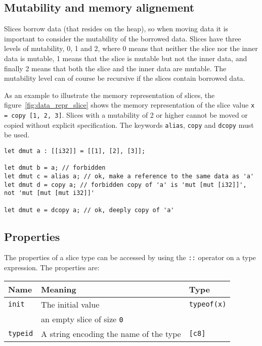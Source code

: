 

\subsection{Mutability and memory alignement}

Slices borrow data (that resides on the heap), so when moving data it is
important to consider the mutability of the borrowed data. Slices have three
levels of mutability, 0, 1 and 2, where 0 means that neither the slice nor the
inner data is mutable, 1 means that the slice is mutable but not the inner data,
and finally 2 means that both the slice and the inner data are mutable. The
mutability level can of course be recursive if the slices contain borrowed data.


As an example to illustrate the memory representation of slices, the
figure~\ref{fig:data_repr_slice} shows the memory representation of the slice
value \texttt{x = copy [1, 2, 3]}. Slices with a mutability of 2 or higher
cannot be moved or copied without explicit specification. The keywords
\texttt{alias}, \texttt{copy} and \texttt{dcopy} must be used.

\begin{lstlisting}[style=coloredverbatim]
let dmut a : [[i32]] = [[1], [2], [3]];

let dmut b = a; // forbidden
let dmut c = alias a; // ok, make a reference to the same data as 'a'
let dmut d = copy a; // forbidden copy of 'a' is 'mut [mut [i32]]', not 'mut [mut [mut i32]]'

let dmut e = dcopy a; // ok, deeply copy of 'a'
\end{lstlisting}



\subsection{Properties}

The properties of a slice type can be accessed by using the \texttt{::} operator on a type expression. The properties are:

\begin{center}\begin{adjustbox}{max width=\linewidth}
  \begin{tabular}{|l|ll|}
    \hline
    Name & Meaning & Type\\
    \hline
    \hline
    \texttt{init} & The initial value & \texttt{typeof(x)}\\
    & an empty slice of size \texttt{0} & \\
    \hline
    \texttt{typeid} & A string encoding the name of the type & \texttt{[c8]} \\
    \hline
  \end{tabular}
\end{adjustbox}\end{center}

